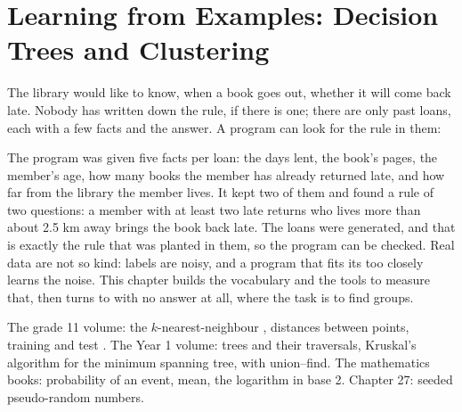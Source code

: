 \chapter{Learning from Examples: Decision Trees and Clustering}\label{ch:b2:trees-and-clustering}

The library would like to know, when a book goes out, whether it will come back late. Nobody has written down the rule,
if there is one; there are only past loans, each with a few facts and the answer. A program can look for the rule in
them:

\label{lst:b2:trees-and-clustering:hook}

\label{out:b2:trees-and-clustering:hook}

The program was given five facts per loan: the days lent, the book's pages, the member's age, how many books the member
has already returned late, and how far from the library the member lives. It kept two of them and found a rule of two
questions: a member with at least two late returns who lives more than about 2.5 km away brings the book back late. The
loans were generated, and that is exactly the rule that was planted in them, so the program can be checked. Real data
are not so kind: labels are noisy, and a program that fits its  too closely learns the noise. This chapter
builds the vocabulary and the tools to measure that, then turns to  with no answer at all, where the task is to
find groups.

\begin{recall}
The grade 11 volume: the $k$-nearest-neighbour , distances between points, training and test . The
Year 1 volume: trees and their traversals, Kruskal's algorithm for the minimum spanning tree, with union--find. The
mathematics books: probability of an event, mean, the logarithm in base 2. Chapter 27: seeded pseudo-random numbers.
\end{recall}

